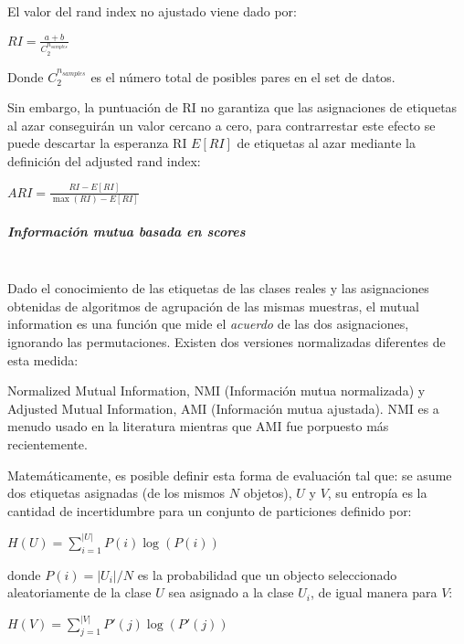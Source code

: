 El valor del rand index no ajustado viene dado por:

\begin{center}
	$RI = \frac{a + b}{C_2^{n_{samples}}}$
\end{center}

Donde $C_2^{n_{samples}}$ es el número total de posibles pares en el set de datos.

Sin embargo, la puntuación de RI no garantiza que las asignaciones de etiquetas al azar conseguirán un valor cercano a cero, para contrarrestar este efecto se puede descartar la esperanza RI $E[RI]$ de etiquetas al azar mediante la definición del adjusted rand index:

\begin{center}
	$ARI = \frac{RI - E[RI]}{\max(RI) - E[RI]}$
	
\end{center}

\subparagraph{Información mutua basada en scores\\\\}

Dado el conocimiento de las etiquetas de las clases reales y las asignaciones obtenidas de algoritmos de agrupación de las mismas muestras, el mutual information es una función que mide el \textit{acuerdo} de las dos asignaciones, ignorando las permutaciones. Existen dos versiones normalizadas diferentes de esta medida:

Normalized Mutual Information, NMI (Información mutua normalizada) y Adjusted Mutual Information, AMI (Información mutua ajustada). NMI es a menudo usado en la literatura mientras que AMI fue porpuesto más recientemente.

Matemáticamente, es posible definir esta forma de evaluación tal que: se asume dos etiquetas asignadas (de los mismos $N$ objetos), $U$ y $V$, su entropía es la cantidad de incertidumbre para un conjunto de particiones definido por:

\begin{center}
	$H(U) = \sum_{i=1}^{|U|}P(i)\log(P(i))$
\end{center}

donde $P(i) = |U_i| / N$ es la probabilidad que un objecto seleccionado aleatoriamente de la clase $U$ sea asignado a la clase $U_i$, de igual manera para $V$:
\begin{center}
	
	$H(V) = \sum_{j=1}^{|V|}P'(j)\log(P'(j))$
\end{center}

